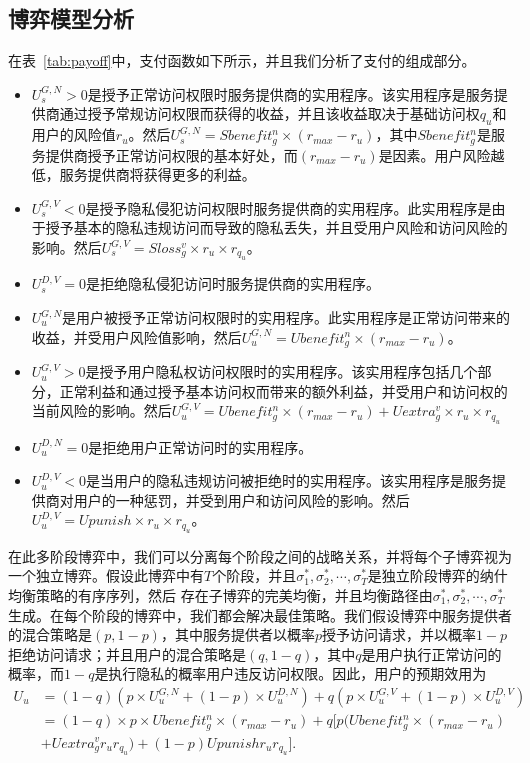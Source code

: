 \subsection{博弈模型分析}

在表~\ref{tab:payoff}中，支付函数如下所示，并且我们分析了支付的组成部分。

\begin{itemize}
	\item $U_s^{G,N} >0$是授予正常访问权限时服务提供商的实用程序。该实用程序是服务提供商通过授予常规访问权限而获得的收益，并且该收益取决于基础访问权$q_u$和用户的风险值$r_u$。然后$U_s^{G,N}= Sbenefit_g^n\times (r_{max}-r_u)$​​，其中$Sbenefit_g^n$是服务提供商授予正常访问权限的基本好处，而$(r_{max}-r_u)$​​是因素。用户风险越低，服务提供商将获得更多的利益。
	\item $U_s^{G,V}<0$是授予隐私侵犯访问权限时服务提供商的实用程序。此实用程序是由于授予基本的隐私违规访问而导致的隐私丢失，并且受用户风险和访问风险的影响。然后$U_s^{G,V}= Sloss_g^v \times r_u \times r_{q_u}$。
	\item $U_s^{D,V} = 0$是拒绝隐私侵犯访问时服务提供商的实用程序。
	\item $U_u^{G,N}$是用户被授予正常访问权限时的实用程序。此实用程序是正常访问带来的收益，并受用户风险值影响，然后$U_u^{G,N}= Ubenefit_g^n \times(r_{max} - r_u)$。
	\item $U_u^{G,V} >0$是授予用户隐私权访问权限时的实用程序。该实用程序包括几个部分，正常利益和通过授予基本访问权而带来的额外利益，并受用户和访问权的当前风险的影响。然后$U_u^{G,V}= Ubenefit_g^n\times(r_{max} - r_u) + Uextra_g^v \times r_u\times r_{q_u}$
	\item $U_u^{D,N} =0$是拒绝用户正常访问时的实用程序。
	\item $U_u^{D,V}<0$是当用户的隐私违规访问被拒绝时的实用程序。该实用程序是服务提供商对用户的一种惩罚，并受到用户和访问风险的影响。然后$U_u^{D,V}= Upunish \times r_u \times r_{q_u}$。
\end{itemize}

在此多阶段博弈中，我们可以分离每个阶段之间的战略关系，并将每个子博弈视为一个独立博弈。假设此博弈中有$T$个阶段，并且$\sigma_1^*, \sigma_2^*, \cdots, \sigma_T^*$是独立阶段博弈的纳什均衡策略的有序序列，然后 存在子博弈的完美均衡，并且均衡路径由$\sigma_1^*, \sigma_2^*, \cdots, \sigma_T^*$生成。在每个阶段的博弈中，我们都会解决最佳策略。我们假设博弈中服务提供者的混合策略是$(p,1-p)$，其中服务提供者以概率$p$授予访问请求，并以概率$1-p$拒绝访问请求；并且用户的混合策略是$(q,1-q)$，其中{$ q $}是用户执行正常访问的概率，而$1-q$是执行隐私的概率用户违反访问权限。因此，用户的预期效用为
\begin{equation}
\begin{split}
U_u&= (1-q)(p\times U_u^{G,N}+ (1-p)\times U_u^{D,N})+ q(p\times U_u^{G,V}+(1-p)\times U_u^{D,V})\\
&=(1-q)\times p \times Ubenefit_g^n \times(r_{max} - r_u)+ q[p(Ubenefit_g^n\times(r_{max} - r_u) \\
&+ Uextra_g^v r_ur_{q_u})+(1-p)Upunishr_ur_{q_u}].
\end{split}
\end{equation}

